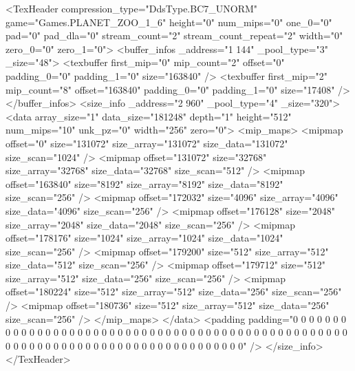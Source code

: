 <TexHeader compression_type="DdsType.BC7_UNORM" game="Games.PLANET_ZOO_1_6" height="0" num_mips="0" one_0="0" pad="0" pad_dla="0" stream_count="2" stream_count_repeat="2" width="0" zero_0="0" zero_1="0">
	<buffer_infos _address="1 144" _pool_type="3" _size="48">
		<texbuffer first_mip="0" mip_count="2" offset="0" padding_0="0" padding_1="0" size="163840" />
		<texbuffer first_mip="2" mip_count="8" offset="163840" padding_0="0" padding_1="0" size="17408" />
	</buffer_infos>
	<size_info _address="2 960" _pool_type="4" _size="320">
		<data array_size="1" data_size="181248" depth="1" height="512" num_mips="10" unk_pz="0" width="256" zero="0">
			<mip_maps>
				<mipmap offset="0" size="131072" size_array="131072" size_data="131072" size_scan="1024" />
				<mipmap offset="131072" size="32768" size_array="32768" size_data="32768" size_scan="512" />
				<mipmap offset="163840" size="8192" size_array="8192" size_data="8192" size_scan="256" />
				<mipmap offset="172032" size="4096" size_array="4096" size_data="4096" size_scan="256" />
				<mipmap offset="176128" size="2048" size_array="2048" size_data="2048" size_scan="256" />
				<mipmap offset="178176" size="1024" size_array="1024" size_data="1024" size_scan="256" />
				<mipmap offset="179200" size="512" size_array="512" size_data="512" size_scan="256" />
				<mipmap offset="179712" size="512" size_array="512" size_data="256" size_scan="256" />
				<mipmap offset="180224" size="512" size_array="512" size_data="256" size_scan="256" />
				<mipmap offset="180736" size="512" size_array="512" size_data="256" size_scan="256" />
			</mip_maps>
		</data>
		<padding padding="0 0 0 0 0 0 0 0 0 0 0 0 0 0 0 0 0 0 0 0 0 0 0 0 0 0 0 0 0 0 0 0 0 0 0 0 0 0 0 0 0 0 0 0 0 0 0 0 0 0 0 0 0 0 0 0 0 0 0 0 0 0 0 0 0 0 0 0 0 0 0 0 0 0 0 0 0 0 0 0" />
	</size_info>
</TexHeader>
